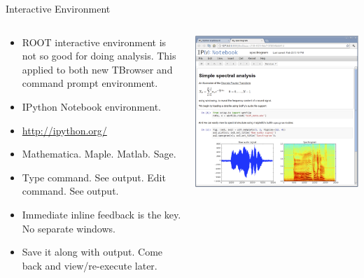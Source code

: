\documentclass{beamer}
\begin{document}
\begin{frame}[fragile]{Interactive Environment}
	\fontsize{10}{10}\selectfont
	\begin{columns}
	\begin{column}{0.5\textwidth}
		\begin{itemize}
		\item ROOT interactive environment is not so good for doing analysis. This applied to both new TBrowser and command prompt environment.
		\item IPython Notebook environment. 
		\item \url{http://ipython.org/}
		\item Mathematica. Maple. Matlab. Sage.
		\item Type command. See output. Edit command. See output.
		\item Immediate inline feedback is the key. No separate windows.
		\item Save it along with output. Come back and view/re-execute later.

		\end{itemize}
	\end{column}
	\begin{column}{0.5\textwidth}
		\includegraphics[width=\textwidth]{pic/ipy-notebook-spectral.png}
	\end{column}
	\end{columns}
\end{frame}
\end{document}
